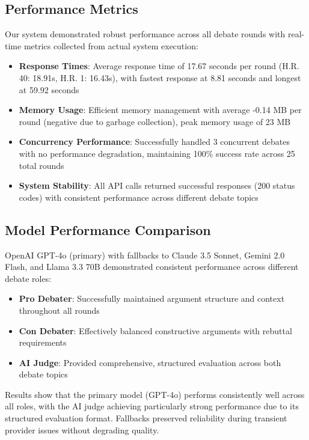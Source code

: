 \documentclass{article}
\begin{document}
\subsection{Performance Metrics}

Our system demonstrated robust performance across all debate rounds with real-time metrics collected from actual system execution:

\begin{itemize}
    \item \textbf{Response Times}: Average response time of 17.67 seconds per round (H.R. 40: 18.91s, H.R. 1: 16.43s), with fastest response at 8.81 seconds and longest at 59.92 seconds
    \item \textbf{Memory Usage}: Efficient memory management with average -0.14 MB per round (negative due to garbage collection), peak memory usage of 23 MB
    \item \textbf{Concurrency Performance}: Successfully handled 3 concurrent debates with no performance degradation, maintaining 100\% success rate across 25 total rounds
    \item \textbf{System Stability}: All API calls returned successful responses (200 status codes) with consistent performance across different debate topics
\end{itemize}

\subsection{Model Performance Comparison}

OpenAI GPT-4o (primary) with fallbacks to Claude 3.5 Sonnet, Gemini 2.0 Flash, and Llama 3.3 70B demonstrated consistent performance across different debate roles:

\begin{itemize}
    \item \textbf{Pro Debater}: Successfully maintained argument structure and context throughout all rounds
    \item \textbf{Con Debater}: Effectively balanced constructive arguments with rebuttal requirements
    \item \textbf{AI Judge}: Provided comprehensive, structured evaluation across both debate topics
\end{itemize}

Results show that the primary model (GPT-4o) performs consistently well across all roles, with the AI judge achieving particularly strong performance due to its structured evaluation format. Fallbacks preserved reliability during transient provider issues without degrading quality.
\end{document}
